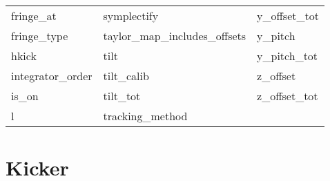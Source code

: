 \begin{tabular}{lll}
fringe_at                   & symplectify                 & y_offset_tot                \\
fringe_type                 & taylor_map_includes_offsets & y_pitch                     \\
hkick                       & tilt                        & y_pitch_tot                 \\
integrator_order            & tilt_calib                  & z_offset                    \\
is_on                       & tilt_tot                    & z_offset_tot                \\
l                           & tracking_method             &                             \\
 \bottomrule
 \end{tabular}
 \vfill
 
 \section{Kicker}
 \label{s:list.kicker}
 
